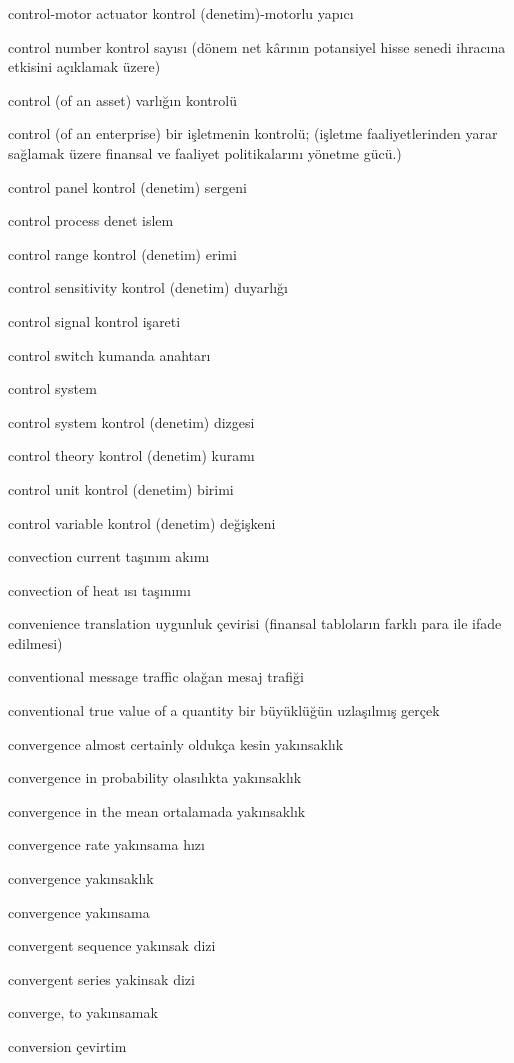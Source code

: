 \documentclass[12pt,fleqn]{article}\usepackage{../../common}
\begin{document}
control-motor actuator kontrol (denetim)-motorlu yapıcı

control number kontrol sayısı (dönem net kârının potansiyel hisse senedi ihracına etkisini açıklamak üzere)

control (of an asset) varlığın kontrolü

control (of an enterprise) bir işletmenin kontrolü; (işletme faaliyetlerinden yarar sağlamak üzere finansal ve faaliyet politikalarını yönetme gücü.)

control panel kontrol (denetim) sergeni

control process denet islem

control range kontrol (denetim) erimi

control sensitivity kontrol (denetim) duyarlığı

control signal kontrol işareti

control switch kumanda anahtarı

control system

control system kontrol (denetim) dizgesi

control theory kontrol (denetim) kuramı

control unit kontrol (denetim) birimi

control variable kontrol (denetim) değişkeni

convection current taşınım akımı

convection of heat ısı taşınımı

convenience translation uygunluk çevirisi (finansal tabloların farklı para ile ifade edilmesi)

conventional message traffic olağan mesaj trafiği

conventional true value of a quantity bir büyüklüğün uzlaşılmış gerçek

convergence almost certainly oldukça kesin yakınsaklık

convergence in probability olasılıkta yakınsaklık

convergence in the mean ortalamada yakınsaklık

convergence rate yakınsama hızı

convergence yakınsaklık

convergence yakınsama

convergent sequence yakınsak dizi

convergent series yakinsak dizi

converge, to yakınsamak

conversion çevirtim
\end{document}
